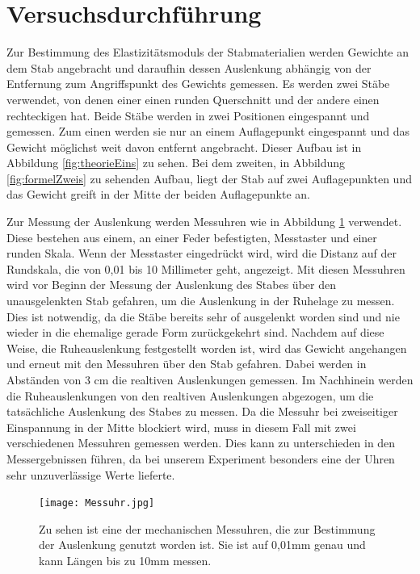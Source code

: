 \documentclass[titlepage = firstcover]{scrartcl}
\begin{document}
    \section{Versuchsdurchführung}
      Zur Bestimmung des Elastizitätsmoduls der Stabmaterialien werden Gewichte an dem Stab angebracht und daraufhin dessen Auslenkung abhängig von der Entfernung
      zum Angriffspunkt des Gewichts gemessen. Es werden zwei Stäbe verwendet, von denen einer einen runden Querschnitt und der andere einen rechteckigen hat. Beide
      Stäbe werden in zwei Positionen eingespannt und gemessen. Zum einen werden sie nur an einem Auflagepunkt eingespannt und das Gewicht möglichst weit davon entfernt
      angebracht. Dieser Aufbau ist in Abbildung \ref{fig:theorieEins} zu sehen. Bei dem zweiten, in Abbildung \ref{fig:formelZweis} zu sehenden Aufbau, liegt der Stab auf zwei Auflagepunkten und das
      Gewicht greift in der Mitte der beiden Auflagepunkte an.\newline

      Zur Messung der Auslenkung werden Messuhren wie in Abbildung \ref{fig:fotoUhr} verwendet. Diese bestehen aus einem, an einer Feder befestigten, Messtaster und einer runden Skala. Wenn der 
      Messtaster eingedrückt wird, wird die Distanz auf der Rundskala, die von 0,01 bis 10 Millimeter geht, angezeigt. Mit diesen Messuhren wird vor Beginn der
      Messung der Auslenkung des Stabes über den unausgelenkten Stab gefahren, um die Auslenkung in der Ruhelage zu messen. Dies ist notwendig, da die Stäbe 
      bereits sehr of ausgelenkt worden sind und nie wieder in die ehemalige gerade Form zurückgekehrt sind. Nachdem auf diese Weise, die Ruheauslenkung 
      festgestellt worden ist, wird das Gewicht angehangen und erneut mit den Messuhren über den Stab gefahren. Dabei werden in Abständen von 3 cm die realtiven 
      Auslenkungen gemessen. Im Nachhinein werden die Ruheauslenkungen von den realtiven Auslenkungen abgezogen, um die tatsächliche Auslenkung des Stabes zu
      messen. Da die Messuhr bei zweiseitiger Einspannung in der Mitte blockiert wird, muss in diesem Fall mit zwei verschiedenen Messuhren gemessen werden. Dies
      kann zu unterschieden in den Messergebnissen führen, da bei unserem Experiment besonders eine der Uhren sehr unzuverlässige Werte lieferte.
      
      \begin{figure}[h]
        \centering
        \texttt{[image: Messuhr.jpg]}
        \caption{Zu sehen ist eine der mechanischen Messuhren, die zur Bestimmung der Auslenkung genutzt worden ist. Sie ist auf 0,01mm genau und kann Längen bis zu 10mm messen.}
        \label{fig:fotoUhr}
      \end{figure}   
    
\end{document}
